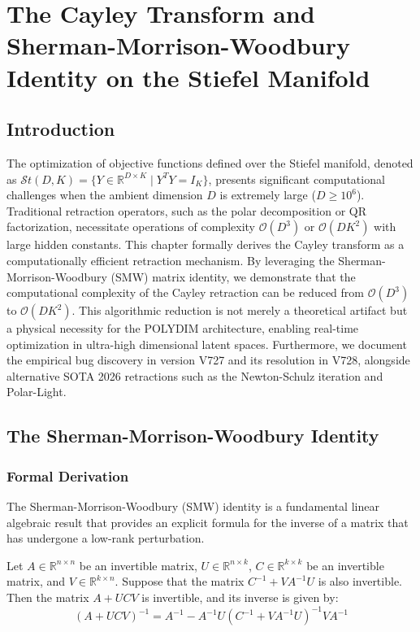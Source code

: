\chapter{The Cayley Transform and Sherman-Morrison-Woodbury Identity on the Stiefel Manifold}
\label{cap:cayley_smw}

\section{Introduction}

The optimization of objective functions defined over the Stiefel manifold, denoted as $\mathcal{S}t(D, K) = \{ Y \in \mathbb{R}^{D \times K} \mid Y^T Y = I_K \}$, presents significant computational challenges when the ambient dimension $D$ is extremely large ($D \ge 10^6$). Traditional retraction operators, such as the polar decomposition or QR factorization, necessitate operations of complexity $\mathcal{O}(D^3)$ or $\mathcal{O}(DK^2)$ with large hidden constants. This chapter formally derives the Cayley transform as a computationally efficient retraction mechanism. By leveraging the Sherman-Morrison-Woodbury (SMW) matrix identity, we demonstrate that the computational complexity of the Cayley retraction can be reduced from $\mathcal{O}(D^3)$ to $\mathcal{O}(DK^2)$. This algorithmic reduction is not merely a theoretical artifact but a physical necessity for the POLYDIM architecture, enabling real-time optimization in ultra-high dimensional latent spaces. Furthermore, we document the empirical bug discovery in version V727 and its resolution in V728, alongside alternative SOTA 2026 retractions such as the Newton-Schulz iteration and Polar-Light.

\section{The Sherman-Morrison-Woodbury Identity}

\subsection{Formal Derivation}

The Sherman-Morrison-Woodbury (SMW) identity is a fundamental linear algebraic result that provides an explicit formula for the inverse of a matrix that has undergone a low-rank perturbation.

\begin{theorem}
Let $A \in \mathbb{R}^{n \times n}$ be an invertible matrix, $U \in \mathbb{R}^{n \times k}$, $C \in \mathbb{R}^{k \times k}$ be an invertible matrix, and $V \in \mathbb{R}^{k \times n}$. Suppose that the matrix $C^{-1} + V A^{-1} U$ is also invertible. Then the matrix $A + UCV$ is invertible, and its inverse is given by:
\begin{equation}
(A + UCV)^{-1} = A^{-1} - A^{-1}U(C^{-1} + VA^{-1}U)^{-1}VA^{-1} \label{eq:smw}
\end{equation}
\end{theorem}

